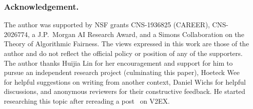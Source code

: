 \subsubsection{Acknowledgement.}
The author was supported by NSF grants CNS-1936825 (CAREER), CNS-2026774, a J.P.~Morgan AI Research Award, and a Simons Collaboration on the Theory of Algorithmic Fairness.
The views expressed in this work are those of the author and do not reflect the official policy or position of any of the supporters.
The author thanks Huijia Lin for her encouragement and support
for him to pursue an independent research project (culminating this paper),
Hoeteck Wee for helpful suggestions on writing from another context,
Daniel Wichs for helpful discussions,
and
anonymous reviewers for their constructive feedback.
He started researching this topic after rereading a post~\cite{V2EX:759538} on V2EX\@.
